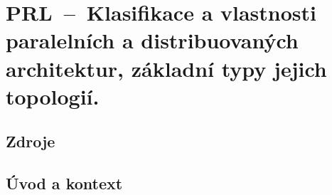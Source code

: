 

\graphicspath{{prl/klasifikace_paralelnich_architektur/figures}}


\chapter{PRL~--~Klasifikace a vlastnosti paralelních a distribuovaných architektur, základní typy jejich topologií.}


\section{Zdroje}

\begin{compactitem}
    \item {}
\end{compactitem}


\section{Úvod a kontext}

\begin{compactitem}
    \item {}
\end{compactitem}

